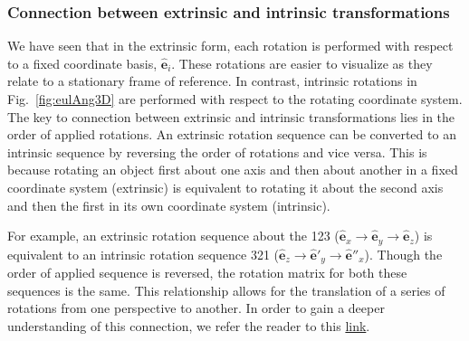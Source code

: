 \documentclass{article}
\def\eh{\hat{\mathbf{e}}}
\begin{document}
\subsubsection*{Connection between extrinsic and intrinsic transformations}

We have seen that in the extrinsic form, each rotation is performed with respect to a fixed coordinate basis, $\eh_i$. These rotations are easier to visualize as they relate to a stationary frame of reference. In contrast, intrinsic rotations in Fig.~\ref{fig:eulAng3D} are performed with respect to the rotating coordinate system. The key to connection between extrinsic and intrinsic transformations lies in the order of applied rotations. An extrinsic rotation sequence can be converted to an intrinsic sequence by reversing the order of rotations and vice versa. This is because rotating an object first about one axis and then about another in a fixed coordinate system (extrinsic) is equivalent to rotating it about the second axis and then the first in its own coordinate system (intrinsic).

For example, an extrinsic rotation sequence about the 123 ($\eh_x \rightarrow \eh_y \rightarrow \eh_z$) is equivalent to an intrinsic rotation sequence 321 ($\eh_z \rightarrow \eh'_y \rightarrow \eh''_x$). Though the order of applied sequence is reversed, the rotation matrix for both these sequences is the same. This relationship allows for the translation of a series of rotations from one perspective to another. In order to gain a deeper understanding of this connection, we refer the reader to this \href{https://dominicplein.medium.com/extrinsic-intrinsic-rotation-do-i-multiply-from-right-or-left-357c38c1abfd}{link}.
\end{document}
